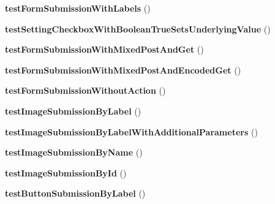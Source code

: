 \begin{DoxyCompactItemize}
\item 
\hypertarget{class_live_test_of_forms_a6ffc9c4610ab85b5717cf1fa04fb3ba6}{
{\bfseries testFormSubmissionWithLabels} ()}
\label{class_live_test_of_forms_a6ffc9c4610ab85b5717cf1fa04fb3ba6}

\item 
\hypertarget{class_live_test_of_forms_a791330c5d1c3eb78edc5079b6b4d9672}{
{\bfseries testSettingCheckboxWithBooleanTrueSetsUnderlyingValue} ()}
\label{class_live_test_of_forms_a791330c5d1c3eb78edc5079b6b4d9672}

\item 
\hypertarget{class_live_test_of_forms_aaff3091c8422d04b2f5f528bbf7443df}{
{\bfseries testFormSubmissionWithMixedPostAndGet} ()}
\label{class_live_test_of_forms_aaff3091c8422d04b2f5f528bbf7443df}

\item 
\hypertarget{class_live_test_of_forms_a3479939cdbc15ffbbd200fd89ab473a7}{
{\bfseries testFormSubmissionWithMixedPostAndEncodedGet} ()}
\label{class_live_test_of_forms_a3479939cdbc15ffbbd200fd89ab473a7}

\item 
\hypertarget{class_live_test_of_forms_aec4a3b19a86b1c417f53d2e604109bea}{
{\bfseries testFormSubmissionWithoutAction} ()}
\label{class_live_test_of_forms_aec4a3b19a86b1c417f53d2e604109bea}

\item 
\hypertarget{class_live_test_of_forms_ae6cda628069971dff6d66745a6f9ef1e}{
{\bfseries testImageSubmissionByLabel} ()}
\label{class_live_test_of_forms_ae6cda628069971dff6d66745a6f9ef1e}

\item 
\hypertarget{class_live_test_of_forms_a32c9f79c086d59ab4386c6d38fbbe271}{
{\bfseries testImageSubmissionByLabelWithAdditionalParameters} ()}
\label{class_live_test_of_forms_a32c9f79c086d59ab4386c6d38fbbe271}

\item 
\hypertarget{class_live_test_of_forms_a95db55c565236d48011042fb83898058}{
{\bfseries testImageSubmissionByName} ()}
\label{class_live_test_of_forms_a95db55c565236d48011042fb83898058}

\item 
\hypertarget{class_live_test_of_forms_a0036eca15c46483e4fe08b48f05fbf4e}{
{\bfseries testImageSubmissionById} ()}
\label{class_live_test_of_forms_a0036eca15c46483e4fe08b48f05fbf4e}

\item 
\hypertarget{class_live_test_of_forms_aafdff63b7804096b3d43c0897d058724}{
{\bfseries testButtonSubmissionByLabel} ()}
\label{class_live_test_of_forms_aafdff63b7804096b3d43c0897d058724}


\end{DoxyCompactItemize}
